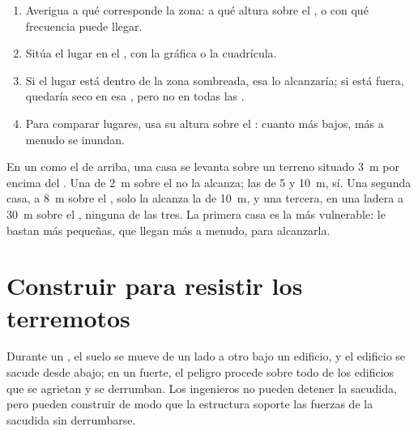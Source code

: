 \begin{method}
\begin{enumerate}
  \item Averigua a qué  corresponde la zona: a qué altura sobre el
        , o con qué frecuencia puede llegar.
  \item Sitúa el lugar en el , con la  gráfica o la cuadrícula.
  \item Si el lugar está dentro de la zona sombreada, esa  lo
        alcanzaría; si está fuera, quedaría seco en esa , pero no
        en todas las .
  \item Para comparar lugares, usa su altura sobre el : cuanto más
        bajos, más a menudo se inundan.
\end{enumerate}
\end{method}

\begin{example}
En un  como el de arriba, una casa se levanta sobre un terreno
situado \qty{3}{m} por encima del . Una  de \qty{2}{m} sobre el
 no la alcanza; las de 5 y \qty{10}{m}, sí. Una segunda casa, a
\qty{8}{m} sobre el , solo la alcanza la  de \qty{10}{m}, y una
tercera, en una ladera a \qty{30}{m} sobre el , ninguna de las tres. La
primera casa es la más vulnerable: le bastan  más pequeñas, que
llegan más a menudo, para alcanzarla.
\end{example}

\section{Construir para resistir los terremotos}

Durante un , el suelo se mueve de un lado a otro bajo un edificio,
y el edificio se sacude desde abajo; en un  fuerte, el peligro
procede sobre todo de los edificios que se agrietan y se derrumban. Los
ingenieros no pueden detener la sacudida, pero pueden construir de modo
que la estructura soporte las fuerzas de la sacudida sin derrumbarse.


